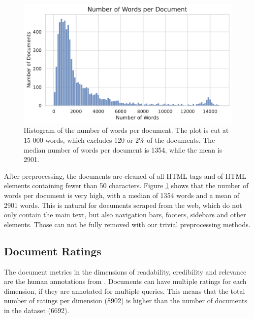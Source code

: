 \begin{figure}[tb]
\centering
\includegraphics[width=\textwidth]{images/num_words_per_passage.pdf}
\caption{Histogram of the number of words per document. The plot is cut at 15 000 words, which excludes 120 or 2\% of the documents. The median number of words per document is 1354, while the mean is 2901.}
\label{fig:num_words_per_document}
\end{figure}
After preprocessing, the documents are cleaned of all HTML tags and of HTML elements containing fewer than 50 characters.
Figure \ref{fig:num_words_per_document} shows that the number of words per document is very high, with a median of 1354 words and a mean of 2901 words.
This is natural for documents scraped from the web, which do not only contain the main text, but also navigation bars, footers, sidebars and other elements.
Those can not be fully removed with our trivial preprocessing methods.
\subsection{Document Ratings}
The document metrics in the dimensions of readability, credibility and relevance are the human annotations from \cite{goeuriot:2021:Consumer}.
Documents can have multiple ratings for each dimension, if they are annotated for multiple queries.
This means that the total number of ratings per dimension (8902) is higher than the number of documents in the dataset (6692).


